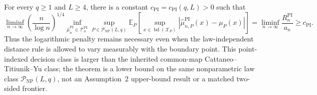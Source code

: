 For every \(q\geq1\) and \(L\geq4\), there is a constant \(c_{\mathrm{PI}}=c_{\mathrm{PI}}(q,L)>0\) such that
\[
 \liminf_{n\to\infty}
 \left(\frac{n}{\log n}\right)^{1/4}
 \inf_{\widehat\mu_n^{\mathrm{PI}}\in\mathcal T_n^{\mathrm{PI}}}
 \sup_{P\in\mathcal P_{\mathrm{NP}}(L,q)}
 \mathbb E_P\!\left[
 \sup_{x\in\operatorname{bd}(\mathcal X_P)}
 \left|\widehat\mu_{n,P}^{\mathrm{PI}}(x)-\mu_P(x)\right|
 \right]
 =\liminf_{n\to\infty}\frac{R_n^{\mathrm{PI}}}{a_n}
 \geq c_{\mathrm{PI}}.
\]
Thus the logarithmic penalty remains necessary even when the law-independent distance rule is allowed to vary measurably with the boundary point.  This point-indexed decision class is larger than the inherited common-map Cattaneo--Titiunik--Yu class; the theorem is a lower bound on the same nonparametric law class \(\mathcal P_{\mathrm{NP}}(L,q)\), not an Assumption~2 upper-bound result or a matched two-sided frontier.